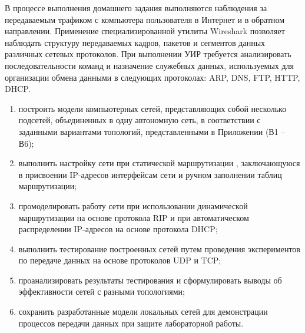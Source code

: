 \documentclass[12pt,onecolumn]{article}
\begin{document}
В процессе выполнения домашнего задания выполняются наблюдения за передаваемым трафиком с компьютера пользователя в Интернет и в обратном направлении. Применение специализированной утилиты Wireshark позволяет наблюдать структуру передаваемых кадров, пакетов и сегментов данных различных сетевых протоколов. При выполнении УИР требуется анализировать последовательности команд и назначение служебных данных, используемых для организации обмена данными в следующих протоколах: ARP, DNS, FTP, HTTP, DHCP.

\begin{enumerate}
    \item построить модели компьютерных сетей, представляющих собой несколько подсетей, объединенных в одну автономную сеть, в соответствии с заданными вариантами топологий, представленными в Приложении (В1 -- В6);
    \item выполнить настройку сети при статической маршрутизации , заключающуюся в присвоении IP-адресов интерфейсам сети и ручном заполнении таблиц маршрутизации;
    \item промоделировать работу сети при использовании динамической маршрутизации на основе протокола RIP и при автоматическом распределении IP-адресов на основе протокола DHCP;
    \item выполнить тестирование построенных сетей путем проведения экспериментов по передаче данных на основе протоколов UDP и TCP;
    \item проанализировать результаты тестирования и сформулировать выводы об эффективности сетей с разными топологиями;
    \item сохранить разработанные модели локальных сетей для демонстрации процессов передачи данных при защите лабораторной работы.
\end{enumerate}
\end{document}
